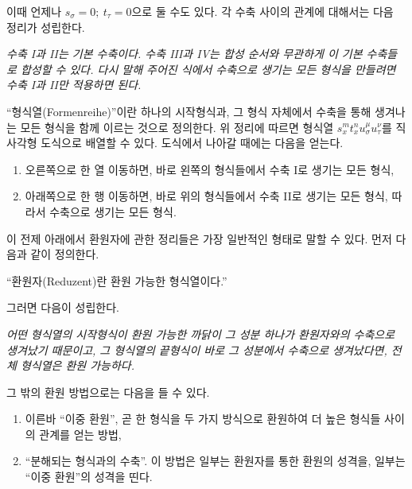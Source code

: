 이때 언제나 $s_\sigma=0;\ t_\tau=0$으로 둘 수도 있다. 각 수축 사이의 관계에 대해서는 다음 정리가 성립한다.

\emph{수축 I과 II는 기본 수축이다. 수축 III과 IV는 합성 순서와 무관하게 이 기본 수축들로 합성할 수 있다. 다시 말해 주어진 식에서 수축으로 생기는 모든 형식을 만들려면 수축 I과 II만 적용하면 된다.}

``형식열(Formenreihe)''이란 하나의 시작형식과, 그 형식 자체에서 수축을 통해 생겨나는 모든 형식을 함께 이르는 것으로 정의한다. 위 정리에 따르면 형식열 $s_x^m t_x^n u_\sigma^\mu u_\tau^\nu$를 직사각형 도식으로 배열할 수 있다. 도식에서 나아갈 때에는 다음을 얻는다.
\begin{enumerate}
\item 오른쪽으로 한 열 이동하면, 바로 왼쪽의 형식들에서 수축 I로 생기는 모든 형식,
\item 아래쪽으로 한 행 이동하면, 바로 위의 형식들에서 수축 II로 생기는 모든 형식, 따라서 수축으로 생기는 모든 형식.
\end{enumerate}

이 전제 아래에서 환원자에 관한 정리들은 가장 일반적인 형태로 말할 수 있다. 먼저 다음과 같이 정의한다.
\begin{center}
``환원자(Reduzent)란 환원 가능한 형식열이다.''
\end{center}
그러면 다음이 성립한다.

\begin{center}
\emph{어떤 형식열의 시작형식이 환원 가능한 까닭이 그 성분 하나가 환원자와의 수축으로 생겨났기 때문이고, 그 형식열의 끝형식이 바로 그 성분에서 수축으로 생겨났다면, 전체 형식열은 환원 가능하다.}
\end{center}

그 밖의 환원 방법으로는 다음을 들 수 있다.
\begin{enumerate}
\item 이른바 ``이중 환원'', 곧 한 형식을 두 가지 방식으로 환원하여 더 높은 형식들 사이의 관계를 얻는 방법,
\item ``분해되는 형식과의 수축''. 이 방법은 일부는 환원자를 통한 환원의 성격을, 일부는 ``이중 환원''의 성격을 띤다.
\end{enumerate}

